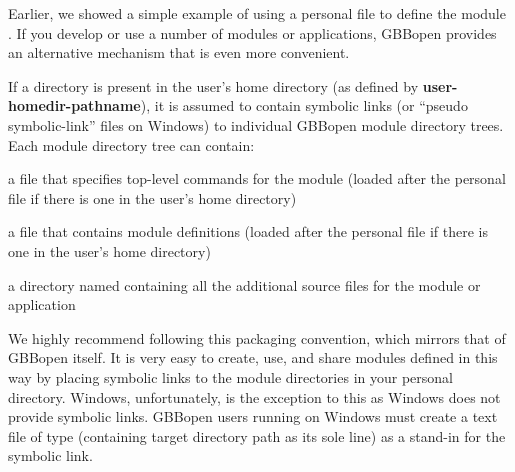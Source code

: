 \documentclass[10pt,twoside,english,pdftex]{article}
\begin{document}
%
%
%
%
%
Earlier, we showed a simple example of using a personal
 file to define the module .  If you
develop or use a number of modules or applications, GBBopen provides an
alternative mechanism that is even more convenient.

If a  directory is present in the user's home
directory (as defined by \textbf{user-homedir-pathname}), it is
assumed to contain symbolic links (or ``pseudo symbolic-link'' files on
Windows) to individual GBBopen module directory trees.  Each module
directory tree can contain:

\begin{tightitemize}
\item a  file that specifies top-level commands for the
  module (loaded after the personal  file
  if there is one in the user's home directory)
\item a  file that contains module definitions (loaded
  after the personal  file if there is one in the
  user's home directory)
\item a directory named  containing all the additional source
  files for the module or application
\end{tightitemize}

We highly recommend following this packaging convention, which mirrors
that of GBBopen itself. It is very easy to create, use,  and share modules
defined in this way by placing symbolic links to the module
directories in your personal  directory.
Windows, unfortunately, is the exception to this as Windows does not
provide symbolic links.  GBBopen users running on Windows must create
a text file of type  (containing target directory path as
its sole line) as a stand-in for the symbolic link. 

\label{sec:hyperdoc}
%
%
%
%
%
%
%
%
%
%
%
\end{document}

